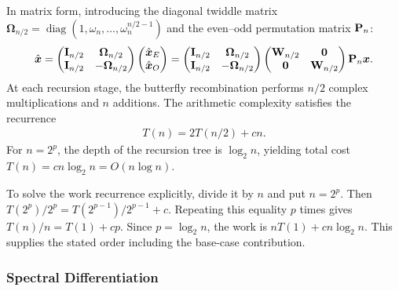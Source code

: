 \documentclass[../main.tex]{subfiles}
\begin{document}
{In matrix form, introducing the diagonal twiddle matrix $\boldsymbol{\Omega}_{n/2} = \operatorname{diag}(1, \omega_n, \dots, \omega_n^{n/2-1})$ and the even--odd permutation matrix $\mathbf{P}_n$:
\begin{align*}
    \hat{\boldsymbol{x}} = \begin{pmatrix} \mathbf{I}_{n/2} & \boldsymbol{\Omega}_{n/2} \\ \mathbf{I}_{n/2} & -\boldsymbol{\Omega}_{n/2} \end{pmatrix} \begin{pmatrix} \hat{\boldsymbol{x}}_E \\ \hat{\boldsymbol{x}}_O \end{pmatrix} = \begin{pmatrix} \mathbf{I}_{n/2} & \boldsymbol{\Omega}_{n/2} \\ \mathbf{I}_{n/2} & -\boldsymbol{\Omega}_{n/2} \end{pmatrix} \begin{pmatrix} \mathbf{W}_{n/2} & \mathbf{0} \\ \mathbf{0} & \mathbf{W}_{n/2} \end{pmatrix} \mathbf{P}_n \boldsymbol{x}.
\end{align*}
At each recursion stage, the butterfly recombination performs $n/2$ complex multiplications and $n$ additions. The arithmetic complexity satisfies the recurrence
\begin{align*}
    T(n) = 2 T(n/2) + c n.
\end{align*}
For $n = 2^p$, the depth of the recursion tree is $\log_2 n$, yielding total cost $T(n) = c n \log_2 n = O(n \log n)$.


To solve the work recurrence explicitly, divide it by $n$ and put $n=2^p$. Then $T(2^p)/2^p=T(2^{p-1})/2^{p-1}+c$. Repeating this equality $p$ times gives $T(n)/n=T(1)+cp$. Since $p=\log_2n$, the work is $nT(1)+cn\log_2n$. This supplies the stated order including the base-case contribution.
}

\subsubsection{Spectral Differentiation}


\label{thm:spectral-differentiation}
\end{document}
